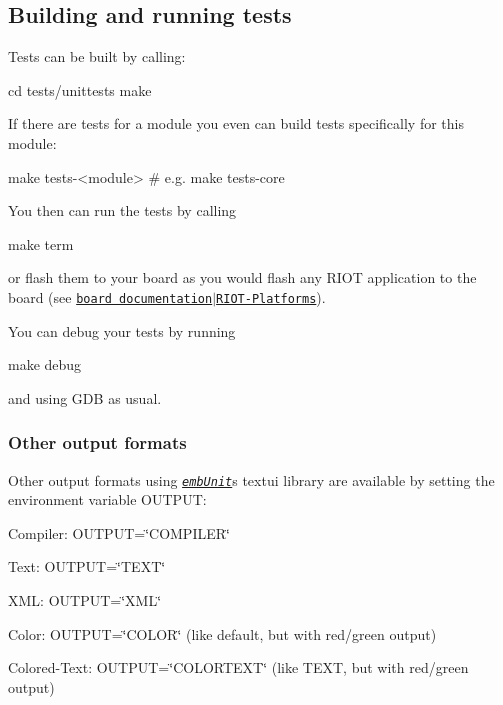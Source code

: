 \subsection*{Building and running tests}

Tests can be built by calling\+:


\begin{DoxyCode}
cd tests/unittests
make
\end{DoxyCode}


If there are tests for a module you even can build tests specifically for this module\+:


\begin{DoxyCode}
make tests-<module>
# e.g.
make tests-core
\end{DoxyCode}


You then can run the tests by calling


\begin{DoxyCode}
make term
\end{DoxyCode}


or flash them to your board as you would flash any R\+I\+OT application to the board (see \href{https://github.com/RIOT-OS/RIOT/wiki/RIOT-Platforms}{\tt board documentation$\vert$\+R\+I\+O\+T-\/\+Platforms}).

You can debug your tests by running


\begin{DoxyCode}
make debug
\end{DoxyCode}
 and using G\+DB as usual.

\subsubsection*{Other output formats}

Other output formats using \href{http://embunit.sourceforge.net/}{\tt {\itshape emb\+Unit}}\textquotesingle{}s {\ttfamily textui} library are available by setting the environment variable {\ttfamily O\+U\+T\+P\+UT}\+:


\begin{DoxyItemize}
\item Compiler\+: {\ttfamily O\+U\+T\+P\+UT=\char`\"{}\+C\+O\+M\+P\+I\+L\+E\+R\char`\"{}}
\item Text\+: {\ttfamily O\+U\+T\+P\+UT=\char`\"{}\+T\+E\+X\+T\char`\"{}}
\item X\+ML\+: {\ttfamily O\+U\+T\+P\+UT=\char`\"{}\+X\+M\+L\char`\"{}}
\item Color\+: {\ttfamily O\+U\+T\+P\+UT=\char`\"{}\+C\+O\+L\+O\+R\char`\"{}} (like default, but with red/green output)
\item Colored-\/\+Text\+: {\ttfamily O\+U\+T\+P\+UT=\char`\"{}\+C\+O\+L\+O\+R\+T\+E\+X\+T\char`\"{}} (like {\ttfamily T\+E\+XT}, but with red/green output)
\end{DoxyItemize}

